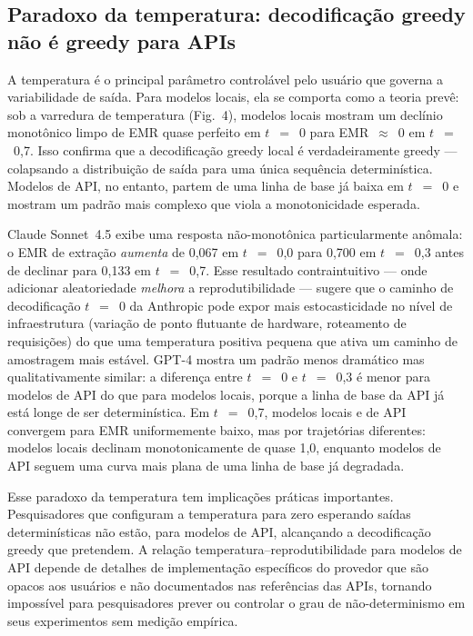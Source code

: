 \documentclass[12pt,a4paper]{article}
\begin{document}
\subsection*{Paradoxo da temperatura: decodificação greedy não é greedy para APIs}

A temperatura é o principal parâmetro controlável pelo usuário que governa a variabilidade de saída.
Para modelos locais, ela se comporta como a teoria prevê: sob a varredura de temperatura (Fig.~4), modelos locais mostram um declínio monotônico limpo de EMR quase perfeito em $t$~$=$~0 para EMR~$\approx$~0 em $t$~$=$~0,7.
Isso confirma que a decodificação greedy local é verdadeiramente greedy --- colapsando a distribuição de saída para uma única sequência determinística.
Modelos de API, no entanto, partem de uma linha de base já baixa em $t$~$=$~0 e mostram um padrão mais complexo que viola a monotonicidade esperada.

Claude Sonnet~4.5 exibe uma resposta não-monotônica particularmente anômala: o EMR de extração \emph{aumenta} de 0,067 em $t$~$=$~0,0 para 0,700 em $t$~$=$~0,3 antes de declinar para 0,133 em $t$~$=$~0,7.
Esse resultado contraintuitivo --- onde adicionar aleatoriedade \emph{melhora} a reprodutibilidade --- sugere que o caminho de decodificação $t$~$=$~0 da Anthropic pode expor mais estocasticidade no nível de infraestrutura (variação de ponto flutuante de hardware, roteamento de requisições) do que uma temperatura positiva pequena que ativa um caminho de amostragem mais estável.
GPT-4 mostra um padrão menos dramático mas qualitativamente similar: a diferença entre $t$~$=$~0 e $t$~$=$~0,3 é menor para modelos de API do que para modelos locais, porque a linha de base da API já está longe de ser determinística.
Em $t$~$=$~0,7, modelos locais e de API convergem para EMR uniformemente baixo, mas por trajetórias diferentes: modelos locais declinam monotonicamente de quase 1,0, enquanto modelos de API seguem uma curva mais plana de uma linha de base já degradada.

Esse paradoxo da temperatura tem implicações práticas importantes.
Pesquisadores que configuram a temperatura para zero esperando saídas determinísticas não estão, para modelos de API, alcançando a decodificação greedy que pretendem.
A relação temperatura--reprodutibilidade para modelos de API depende de detalhes de implementação específicos do provedor que são opacos aos usuários e não documentados nas referências das APIs, tornando impossível para pesquisadores prever ou controlar o grau de não-determinismo em seus experimentos sem medição empírica.
\end{document}

